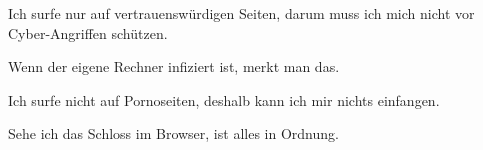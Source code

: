 \item Ich surfe nur auf vertrauenswürdigen Seiten, darum muss ich mich nicht vor Cyber-Angriffen schützen.
\item Wenn der eigene Rechner infiziert ist, merkt man das.
\item Ich surfe nicht auf Pornoseiten, deshalb kann ich mir nichts einfangen.
\item Sehe ich das Schloss im Browser, ist alles in Ordnung.